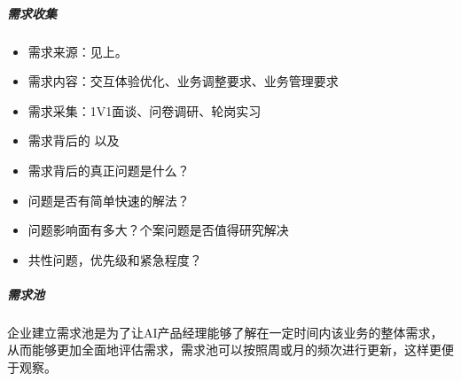 \documentclass[letterpaper,11pt,english]{sphinxmanual}
\begin{document}
\subparagraph{需求收集}
\label{\detokenize{chapter_skill/upgrade_manage:id6}}\begin{itemize}
\item {} 
需求来源：见上。

\item {} 
需求内容：交互体验优化、业务调整要求、业务管理要求

\item {} 
需求采集：1V1面谈、问卷调研、轮岗实习

\item {} 
需求背后的  以及 

\item {} 
需求背后的真正问题是什么？

\item {} 
问题是否有简单快速的解法？

\item {} 
问题影响面有多大？个案问题是否值得研究解决

\item {} 
共性问题，优先级和紧急程度？

\end{itemize}


\subparagraph{需求池}
\label{\detokenize{chapter_skill/upgrade_manage:id7}}
企业建立需求池是为了让AI产品经理能够了解在一定时间内该业务的整体需求，从而能够更加全面地评估需求，需求池可以按照周或月的频次进行更新，这样更便于观察。
\end{document}
